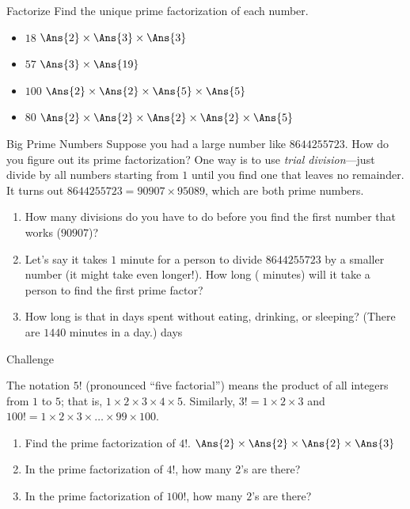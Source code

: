 \documentclass[12pt,letterpaper]{article}
\begin{document}
\begin{problem}{Factorize}
 Find the unique prime factorization of each number.

 \begin{itemize}
  \item $18$ \hfill $\Ans{2} \times \Ans{3} \times \Ans{3}$
  \item $57$ \hfill $\Ans{3} \times \Ans{19}$
  \item $100$ \hfill $\Ans{2} \times \Ans{2} \times \Ans{5} \times \Ans{5}$
  \item $80$ \hfill $\Ans{2} \times \Ans{2} \times \Ans{2} \times \Ans{2}
  \times \Ans{5}$
 \end{itemize}
\end{problem}

\begin{problem}{Big Prime Numbers}
 Suppose you had a large number like $8644255723$. How do you figure out its
 prime factorization? One way is to use \emph{trial division}---just divide by
 all numbers starting from $1$ until you find one that leaves no remainder. It
 turns out $8644255723 = 90907\times95089$, which are both prime numbers.

 \begin{enumerate}
  \item How many divisions do you have to do before you find the first number
  that works ($90907$)?
  \item Let's say it takes $1$ minute for a person to divide $8644255723$ by a
  smaller number (it might take even longer!). How long
  ( minutes) will it take a person to find the first
  prime factor?
  \item How long is that in days spent without eating, drinking, or sleeping?
  (There are $1440$ minutes in a day.) \hfill {} days
 \end{enumerate}

\end{problem}

\begin{problem}{Challenge}

The notation $5!$ (pronounced ``five factorial'') means the product of all
integers from $1$ to $5$; that is, $1 \times 2 \times 3 \times 4 \times 5$.
Similarly, $3! = 1 \times 2 \times 3$ and $100! = 1 \times 2 \times 3
\times\ldots\times 99 \times 100$.

\begin{enumerate}
 \item Find the prime factorization of $4!$. \hfill
 $\Ans{2} \times \Ans{2} \times \Ans{2} \times \Ans{3}$
 \item In the prime factorization of $4!$, how many $2$'s are there?
 \item In the prime factorization of $100!$, how many $2$'s are there?
\end{enumerate}

\end{problem}
\end{document}

